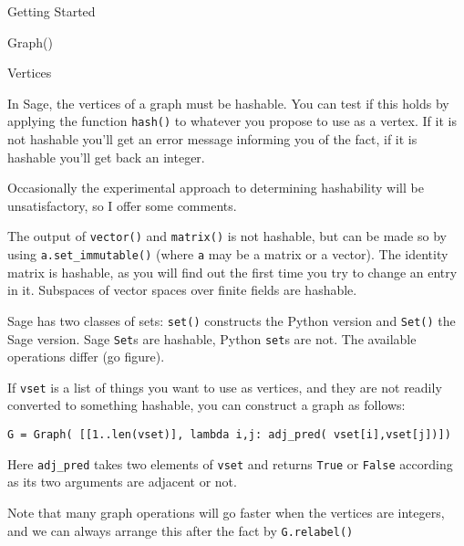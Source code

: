 \begin{chap}{Getting Started}
\begin{sect}{Graph()}
\begin{sagecode}
\begin{sageoutput}
[2, 3, 2, 3]
\end{sageoutput}
\end{sagecode}
%
\end{sect}
%
\begin{sect}{Vertices}
%
\begin{para}
In Sage, the vertices of a graph must be hashable. You can test if this holds 
by applying the function \verb|hash()| to whatever you propose to use as a vertex.
If it is not hashable you'll get an error message informing you of the fact, if it
is hashable you'll get back an integer.
\end{para}
%
\begin{para}
Occasionally the experimental approach to determining hashability will be 
unsatisfactory, so I offer some comments.
\end{para}
%
\begin{para}
The output of \verb|vector()| and \verb|matrix()| is not hashable, but can
be made so by using \verb|a.set_immutable()| (where \verb|a| may be a matrix
or a vector). The identity matrix is hashable, as you will find out the first 
time you try to change an entry in it. Subspaces of vector
spaces over finite fields are hashable.
\end{para}
%
\begin{para}
Sage has two classes of sets: \verb|set()| constructs the Python version and
\verb|Set()| the Sage version. Sage \verb|Set|s are hashable, Python \verb|set|s are not.
The available operations differ (go figure).
\end{para}
%
\begin{para}
If \verb|vset| is a list of things you want to use as vertices, and they are not 
readily converted to something hashable, you can construct a graph as follows:
\end{para}
%
\begin{para}
\verb|G = Graph( [[1..len(vset)], lambda i,j: adj_pred( vset[i],vset[j])])|
\end{para}
%
\begin{para}
Here \verb|adj_pred| takes two elements of \verb|vset| and returns
\verb|True| or \verb|False| according as its two arguments are adjacent or not.
\end{para}
%
\begin{para}
Note that many graph operations will go faster when the vertices are integers,
and we can always arrange this after the fact by \verb|G.relabel()|
\end{para}
%
\end{sect}
%
\end{chap}
